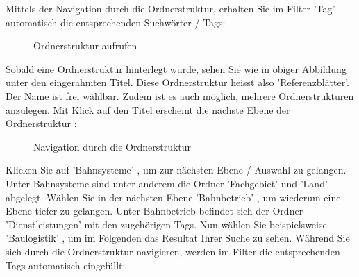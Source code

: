 Mittels der Navigation durch die Ordnerstruktur, erhalten Sie im Filter 'Tag' automatisch die entsprechenden Suchwörter / Tags:

\begin{figure}[H]
\caption{Ordnerstruktur aufrufen}
\end{figure}

Sobald eine Ordnerstruktur hinterlegt wurde, sehen Sie wie in obiger Abbildung unter  den eingerahmten Titel. Diese Ordnerstruktur heisst also 'Referenzblätter'. Der Name ist frei wählbar. Zudem ist es auch möglich, mehrere Ordnerstrukturen anzulegen. Mit Klick auf den Titel erscheint die nächste Ebene der Ordnerstruktur :

\begin{figure}[H]
\caption{Navigation durch die Ordnerstruktur}
\end{figure}

Klicken Sie auf 'Bahnsysteme' , um zur nächsten Ebene / Auswahl zu gelangen. Unter Bahnsysteme sind unter anderem die Ordner 'Fachgebiet' und 'Land' abgelegt. Wählen Sie in der nächsten Ebene 'Bahnbetrieb' , um wiederum eine Ebene tiefer zu gelangen. Unter Bahnbetrieb befindet sich der Ordner 'Dienstleistungen' mit den zugehörigen Tags. Nun wählen Sie beispielsweise 'Baulogistik' , um im Folgenden das Resultat Ihrer Suche zu sehen. Während Sie sich durch die Ordnerstruktur navigieren, werden im Filter die entsprechenden Tags automatisch eingefüllt:

